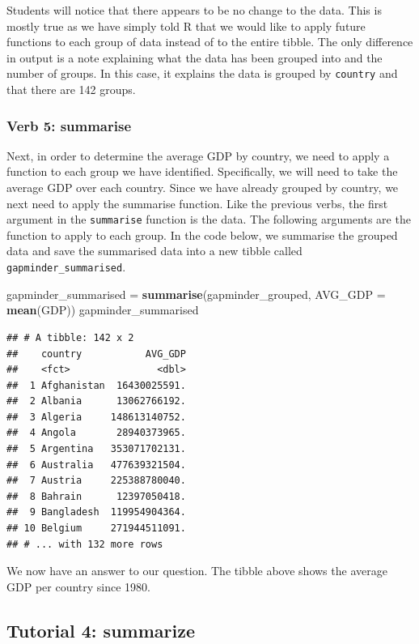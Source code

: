 \documentclass[]{book}
\newenvironment{Shaded}{\begin{snugshade}}{\end{snugshade}}
\newcommand{\DataTypeTok}[1]{\textcolor[rgb]{0.13,0.29,0.53}{#1}}
\newcommand{\KeywordTok}[1]{\textcolor[rgb]{0.13,0.29,0.53}{\textbf{#1}}}
\newcommand{\NormalTok}[1]{#1}
\newcommand{\StringTok}[1]{\textcolor[rgb]{0.31,0.60,0.02}{#1}}
\begin{document}
Students will notice that there appears to be no change to the data. This is mostly true as we have simply told R that we would like to apply future functions to each group of data instead of to the entire tibble. The only difference in output is a note explaining what the data has been grouped into and the number of groups. In this case, it explains the data is grouped by \texttt{country} and that there are 142 groups.

\hypertarget{verb-5-summarise}{%
\subsubsection{Verb 5: summarise}\label{verb-5-summarise}}

Next, in order to determine the average GDP by country, we need to apply a function to each group we have identified. Specifically, we will need to take the average GDP over each country. Since we have already grouped by country, we next need to apply the summarise function. Like the previous verbs, the first argument in the \texttt{summarise} function is the data. The following arguments are the function to apply to each group. In the code below, we summarise the grouped data and save the summarised data into a new tibble called \texttt{gapminder\_summarised}.

\begin{Shaded}
\begin{Highlighting}[]
\NormalTok{gapminder_summarised =}\StringTok{ }\KeywordTok{summarise}\NormalTok{(gapminder_grouped, }\DataTypeTok{AVG_GDP =} \KeywordTok{mean}\NormalTok{(GDP))}
\NormalTok{gapminder_summarised}
\end{Highlighting}
\end{Shaded}

\begin{verbatim}
## # A tibble: 142 x 2
##    country           AVG_GDP
##    <fct>               <dbl>
##  1 Afghanistan  16430025591.
##  2 Albania      13062766192.
##  3 Algeria     148613140752.
##  4 Angola       28940373965.
##  5 Argentina   353071702131.
##  6 Australia   477639321504.
##  7 Austria     225388780040.
##  8 Bahrain      12397050418.
##  9 Bangladesh  119954904364.
## 10 Belgium     271944511091.
## # ... with 132 more rows
\end{verbatim}

We now have an answer to our question. The tibble above shows the average GDP per country since 1980.

\hypertarget{tutorial-4-summarize}{%
\subsection{Tutorial 4: summarize}\label{tutorial-4-summarize}}
\end{document}
